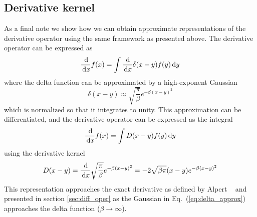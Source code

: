 \subsection{Derivative kernel}
As a final note we show how we can obtain approximate representations of the derivative 
operator using the same framework as presented above. The derivative operator can be
expressed as
\begin{equation}
    \frac{\,\mathrm{d}}{\,\mathrm{d} x} f(x) = \int \frac{\,\mathrm{d}}{\,\mathrm{d} x} \delta(x-y) f(y) \,\mathrm{d} y
\end{equation}
where the delta function can be approximated by a high-exponent Gaussian
\begin{equation}
    \label{eq:delta_approx}
    \delta(x-y) \approx \sqrt{\frac{\pi}{\beta}} e^{-\beta (x-y)^2}
\end{equation}
which is normalized so that it integrates to unity. This approximation can be 
differentiated, and the derivative operator can be expressed as the integral
\begin{equation}
    \frac{\,\mathrm{d}}{\,\mathrm{d} x} f(x) = \int D(x-y)f(y) \,\mathrm{d} y
\end{equation}
using the derivative kernel
\begin{equation}
    D(x-y)  = \frac{\,\mathrm{d}}{\,\mathrm{d} x} \sqrt{\frac{\pi}{\beta}}e^{-\beta (x-y)^2} 
	    = -2 \sqrt{\beta\pi}(x-y)e^{-\beta (x-y)^2}
\end{equation}
This representation approaches the exact derivative as defined by Alpert 
\etal~\cite{Alpert} and presented in section \ref{sec:diff_oper} as the Gaussian 
in Eq.~(\ref{eq:delta_approx}) approaches the delta function ($\beta \rightarrow \infty$).
